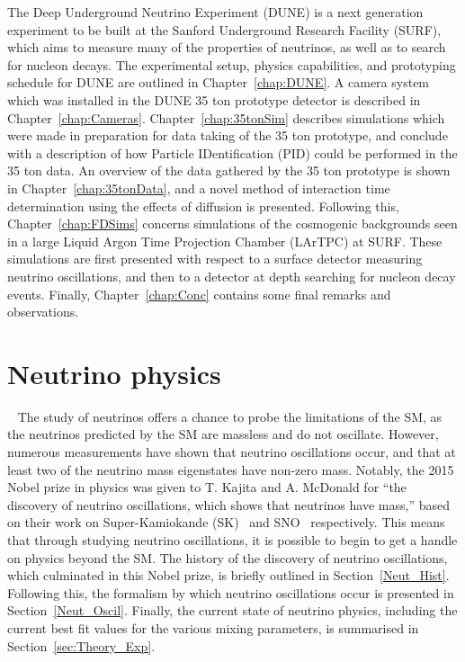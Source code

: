 The Deep Underground Neutrino Experiment (DUNE) is a next generation experiment to be built at the Sanford Underground Research Facility (SURF), which aims to measure many of the properties of neutrinos, as well as to search for nucleon decays. The experimental setup, physics capabilities, and prototyping schedule for DUNE are outlined in Chapter~\ref{chap:DUNE}. A camera system which was installed in the DUNE 35 ton prototype detector is described in Chapter~\ref{chap:Cameras}. Chapter~\ref{chap:35tonSim} describes simulations which were made in preparation for data taking of the 35 ton prototype, and conclude with a description of how Particle IDentification (PID) could be performed in the 35 ton data. An overview of the data gathered by the 35 ton prototype is shown in Chapter~\ref{chap:35tonData}, and a novel method of interaction time determination using the effects of diffusion is presented. Following this, Chapter~\ref{chap:FDSims} concerns simulations of the cosmogenic backgrounds seen in a large Liquid Argon Time Projection Chamber (LArTPC) at SURF. These simulations are first presented with respect to a surface detector measuring neutrino oscillations, and then to a detector at depth searching for nucleon decay events. Finally, Chapter~\ref{chap:Conc} contains some final remarks and observations. \\

\section{Neutrino physics} ~\label{sec:NeutPhys}  %
The study of neutrinos offers a chance to probe the limitations of the SM, as the neutrinos predicted by the SM are massless and do not oscillate. However, numerous measurements have shown that neutrino oscillations occur, and that at least two of the neutrino mass eigenstates have non-zero mass. Notably, the 2015 Nobel prize in physics was given to T. Kajita and A. McDonald for ``the discovery of neutrino oscillations, which shows that neutrinos have mass,'' based on their work on Super-Kamiokande (SK)~\citep{PhysRevLett.81.1562} and SNO~\citep{PhysRevLett.89.011301} respectively. This means that through studying neutrino oscillations, it is possible to begin to get a handle on physics beyond the SM. The history of the discovery of neutrino oscillations, which culminated in this Nobel prize, is briefly outlined in Section~\ref{Neut_Hist}. Following this, the formalism by which neutrino oscillations occur is presented in Section~\ref{Neut_Oscil}. Finally, the current state of neutrino physics, including the current best fit values for the various mixing parameters, is summarised in Section~\ref{sec:Theory_Exp}. \\

